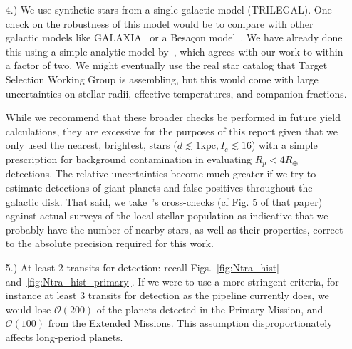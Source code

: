 \begin{itemize}
	
	\item [4.) We use synthetic stars from a single galactic model (TRILEGAL).]
	One check on the robustness of this model would be to compare with other galactic models like GALAXIA~\citep{sharma_galaxia_2011} or a Besa\c con model~\citep{robin2003synthetic}.
	We have already done this using a simple analytic model by~\citet{winn_searchable_2013}, which agrees with our work to within a factor
	of two.
	We might eventually use the real star catalog that \tesss Target Selection Working Group is assembling, but this would come with large uncertainties on stellar radii, effective temperatures, and companion fractions.
	
	While we recommend that these broader checks be performed in future \tess yield calculations, they are excessive for the purposes of this report given that we only used the nearest, brightest, stars ($d\lesssim\mathrm{1kpc}, I_c\lesssim16$) with a simple prescription for background contamination in evaluating \tesss $R_p<4R_\oplus$ detections.
	The relative uncertainties become much greater if we try to estimate detections of giant planets and false positives throughout the galactic disk.
	That said, we take~'s cross-checks (cf Fig. 5 of that paper) against actual surveys of the local stellar population as indicative that we probably have the number of nearby stars, as well as their properties, correct  to the absolute precision required for this work.
	
	\item [5.) At least 2 transits for detection:] recall Figs.~\ref{fig:Ntra_hist} and~\ref{fig:Ntra_hist_primary}.
	If we were to use a more stringent criteria, for instance at least 3 transits for detection as the \kepler pipeline currently does, we would lose $\mathcal{O}(200)$ of the planets detected in the Primary Mission, and $\mathcal{O}(100)$ from the Extended Missions.
	This assumption disproportionately affects long-period planets.
	
	

\end{itemize}
